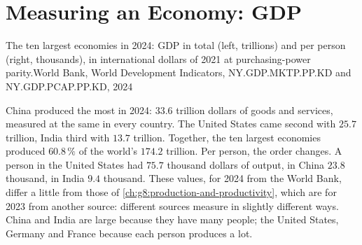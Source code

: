 \chapter{Measuring an Economy: GDP}\label{ch:g8:gdp}

\begin{openingchart}{The ten largest economies in 2024: GDP in total (left, trillions) and per
person (right, thousands), in international dollars of 2021 at purchasing-power parity.}{World
Bank, World Development Indicators, NY.GDP.MKTP.PP.KD and NY.GDP.PCAP.PP.KD, 2024}
\end{openingchart}

China produced the most in 2024: $33.6$ trillion dollars of goods and services, measured at
the same  in every country. The United States came second with $25.7$ trillion, India
third with $13.7$ trillion. Together, the ten largest economies produced $60.8\,\%$ of the
world's $174.2$ trillion. Per person, the order changes. A person in the United States had
$75.7$ thousand dollars of output, in China $23.8$ thousand, in India $9.4$ thousand. These values,
for 2024 from the World Bank, differ a little from those of
\cref{ch:g8:production-and-productivity}, which are for 2023 from another source: different
sources measure in slightly different ways. China and
India are large because they have many people; the United States, Germany and France because
each person produces a lot.

